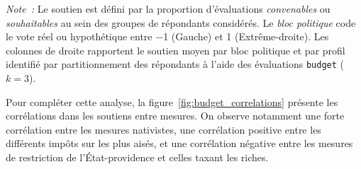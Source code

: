 \documentclass[12pt,french]{article}
\begin{document}

\begin{table}[htbp]
  \centering\footnotesize\setlength{\tabcolsep}{4pt}\caption{Soutien aux ensembles de mesures \texttt{budget} identifiés par partitionnement ($k$=3). }%
     
  \par\smallskip
  {\footnotesize \textit{Note~:} Le soutien est défini par la proportion d'évaluations \textit{convenables} ou \textit{souhaitables} au sein des groupes de répondants considérés. Le \textit{bloc politique} code le vote réel ou hypothétique entre $-$1 (Gauche) et 1 (Extrême-droite). Les colonnes de droite rapportent le soutien moyen par bloc politique et par profil identifié par partitionnement des répondants à l'aide des évaluations \texttt{budget} ($k=3$).}
  \label{tab:cluster_measures_budget3}
\end{table}

Pour compléter cette analyse, la figure~\ref{fig:budget_correlations} présente les corrélations dans les soutiens entre mesures. On observe notamment une forte corrélation entre les mesures nativistes,  
une corrélation positive entre les différents impôts sur les plus aisés, et une corrélation négative entre les mesures de restriction de l'État-providence et celles taxant les riches.

\end{document}
